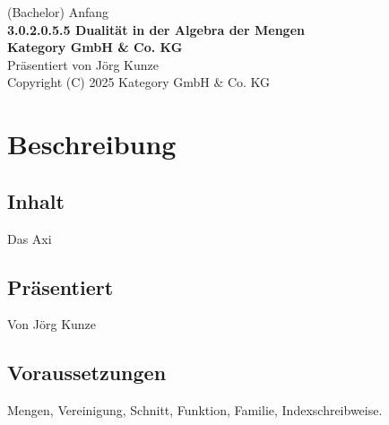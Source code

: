 \documentclass[a4paper]{amsart}
\theoremstyle{definition}
\begin{document}
\begin{titlepage}
\centering
{\huge
(Bachelor) Anfang\\[1cm]
\textbf{3.0.2.0.5.5 Dualität in der Algebra der Mengen}
}\\[1cm]

\textbf{Kategory GmbH \& Co. KG}\\
Präsentiert von Jörg Kunze\\
Copyright (C) 2025 Kategory GmbH \& Co. KG

\end{titlepage}

%

\newpage

\section*{Beschreibung}

\subsection*{Inhalt}
Das Axi

\subsection*{Präsentiert}
Von Jörg Kunze

\subsection*{Voraussetzungen}
Mengen, Vereinigung, Schnitt, Funktion, Familie, Indexschreibweise.
\end{document}
